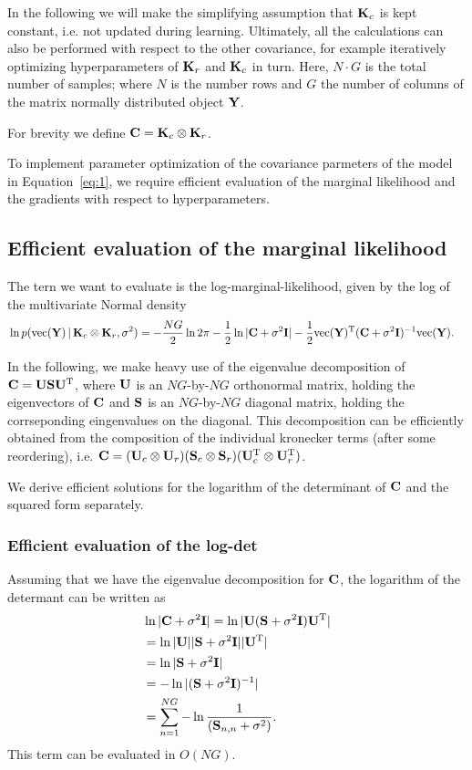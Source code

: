 \documentclass{article}
\newcommand{\B}[1]{{\bf{#1}}}
\begin{document}
In the following we will make the simplifying assumption that
$\B{K}_c$ is kept constant, i.e. not updated during learning.
Ultimately, all the calculations can also be performed with respect to
the other covariance, for example iteratively optimizing
hyperparameters of $\B{K}_r$ and $\B{K}_c$ in turn.
Here, $N \cdot G$ is the total number of samples; where $N$
is the number rows and $G$ the number of columns of the matrix normally
distributed object $\B{Y}$.

For brevity we define $\B{C} = \B{K}_c \otimes \B{K}_r$.

To implement parameter optimization of the covariance parmeters of the
model in Equation~\eqref{eq:1}, we require efficient evaluation of the
marginal likelihood and the gradients with respect to hyperparameters.


\subsection{Efficient evaluation of the marginal likelihood}
The tern we want to evaluate is the log-marginal-likelihood, given by the log of the multivariate Normal density
\begin{align}&\label{eq:lml}
\ln p(\col(\B{Y}) \given \B{K}_c \otimes \B{K}_r,\sigma^2) = -\frac{NG}{2} \ln{2\pi}  -\frac{1}{2}\ln
| \B{C} + \sigma^{2} \B{I}|  - \frac{1}{2} \col(\B{Y})^{\T} (\B{C} + \sigma^2
\B{I})^{-1} \col(\B{Y}). 
\end{align} 

In the following, we make heavy use of the eigenvalue decomposition of $\B{C} = \B{U} \B{S} \B{U}^{\T}$, where $\B{U}$ is an $NG$-by-$NG$ orthonormal matrix, holding the eigenvectors of $\B{C}$ and $\B{S}$ is an $NG$-by-$NG$  diagonal matrix, holding the corrseponding eingenvalues on the diagonal.
This decomposition can be efficiently obtained from the composition of
the individual kronecker terms (after some reordering), i.e. 
$\B{C} = (\B{U}_c \otimes \B{U}_r) (\B{S}_c \otimes \B{S}_r) (\B{U}_c^\T
\otimes \B{U}_r^\T)$.

We derive efficient solutions for the logarithm of the determinant of $\B{C}$ and the squared form separately.


\subsubsection{Efficient evaluation of the log-det}
Assuming that we have the eigenvalue decomposition for $\B{C}$,
the logarithm of the determant can be written as\\
\begin{align}&
\label{eq:2}
\ln | \B{C} + \sigma^{2} \B{I}|  =  \ln |\B{U} (\B{S} +
\sigma^2\B{I}) \B{U}^{\T} | \\&
   = \ln |\B{U}| |\B{S} + \sigma^2 \B{I}| |\B{U}^{\T}| \\&
   = \ln |\B{S} + \sigma^2 \B{I}|\\&
 = -\ln |(\B{S} + \sigma^2 \B{I})^{-1}|\\&
 = \sum_{n=1}^{NG} -\ln \frac{1}{(\B{S}_{n,n} + \sigma^2)}.
\end{align}
This term can be evaluated in $O(NG)$.
\end{document}
